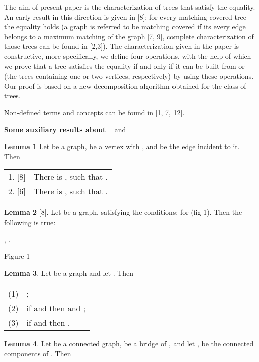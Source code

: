 \documentclass{article}
\begin{document}
The aim of present paper is the characterization of trees that satisfy the  equality. An early result in this direction is given in [8]:
for every matching covered tree  the equality 
holds (a graph  is referred to be matching covered if its every edge
belongs to a maximum matching of the graph [7, 9], complete characterization
of those trees can be found in [2,3]). The characterization given in the
paper is constructive, more specifically, we define four operations, with
the help of which we prove that a tree  satisfies the equality  if and only if it can be built from  or  (the trees
containing one or two vertices, respectively) by using these operations. Our
proof is based on a new decomposition algorithm obtained for the class of
trees.

Non-defined terms and concepts can be found in [1, 7, 12].

\bigskip

\begin{center}
\textbf{Some auxiliary results about }\textbf{\ }
and 
\end{center}

\bigskip

\textbf{Lemma 1} Let  be a graph,  be a vertex with , and  be the edge incident to it. Then

\begin{tabular}{ll}
1. [8] & There is , such that . \\ 
2. [6] & There is , such that .\end{tabular}

\textbf{Lemma 2 }[8]. Let  be a graph,  satisfying the conditions:    for  (fig
1). Then the following is true:

\begin{center}
, .


Figure 1\bigskip
\end{center}

\textbf{Lemma 3}. Let  be a graph and let . Then

\begin{tabular}{ll}
(1) & ; \\ 
(2) & if  and then  and ; \\ 
(3) & if  and then .\end{tabular}

\textbf{Lemma 4}. Let  be a connected graph,  be a bridge of , and
let ,  be the connected components of . Then
\end{document}
